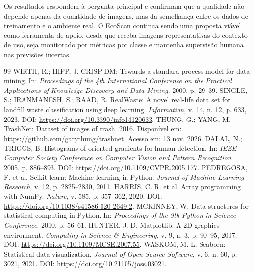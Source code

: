 \documentclass[11pt,a4paper]{article}
\begin{document}
Os resultados respondem à pergunta principal e confirmam que a qualidade não depende apenas da quantidade de imagens, mas da semelhança entre os dados de treinamento e o ambiente real. O EcoScan continua sendo uma proposta viável como ferramenta de apoio, desde que receba imagens representativas do contexto de uso, seja monitorado por métricas por classe e mantenha supervisão humana nas previsões incertas.

\begin{thebibliography}{99}
 WIRTH, R.; HIPP, J. CRISP-DM: Towards a standard process model for data mining. In: \textit{Proceedings of the 4th International Conference on the Practical Applications of Knowledge Discovery and Data Mining}. 2000. p. 29--39.
 SINGLE, S.; IRANMANESH, S.; RAAD, R. RealWaste: A novel real-life data set for landfill waste classification using deep learning. \textit{Information}, v. 14, n. 12, p. 633, 2023. DOI: \url{https://doi.org/10.3390/info14120633}.
 THUNG, G.; YANG, M. TrashNet: Dataset of images of trash. 2016. Disponível em: \url{https://github.com/garythung/trashnet}. Acesso em: 13 nov. 2026.
 DALAL, N.; TRIGGS, B. Histograms of oriented gradients for human detection. In: \textit{IEEE Computer Society Conference on Computer Vision and Pattern Recognition}. 2005. p. 886--893. DOI: \url{https://doi.org/10.1109/CVPR.2005.177}.
 PEDREGOSA, F. et al. Scikit-learn: Machine learning in Python. \textit{Journal of Machine Learning Research}, v. 12, p. 2825--2830, 2011.
 HARRIS, C. R. et al. Array programming with NumPy. \textit{Nature}, v. 585, p. 357--362, 2020. DOI: \url{https://doi.org/10.1038/s41586-020-2649-2}.
 MCKINNEY, W. Data structures for statistical computing in Python. In: \textit{Proceedings of the 9th Python in Science Conference}. 2010. p. 56--61.
 HUNTER, J. D. Matplotlib: A 2D graphics environment. \textit{Computing in Science \& Engineering}, v. 9, n. 3, p. 90--95, 2007. DOI: \url{https://doi.org/10.1109/MCSE.2007.55}.
 WASKOM, M. L. Seaborn: Statistical data visualization. \textit{Journal of Open Source Software}, v. 6, n. 60, p. 3021, 2021. DOI: \url{https://doi.org/10.21105/joss.03021}.
\end{thebibliography}
\end{document}
